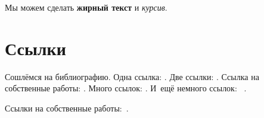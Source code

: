 Мы можем сделать \textbf{жирный текст} и \textit{курсив}.

\section{Ссылки}\label{sec:ch1/sec2}

Сошлёмся на библиографию.
Одна ссылка: \cite[с.~54]{Sokolov}\cite[с.~36]{Gaidaenko}.
Две ссылки: \cite{Sokolov,Gaidaenko}.
Ссылка на собственные работы: \cite{vakbib1, confbib2}.
Много ссылок: %
\cite{Lermontov, Management, Borozda, Marketing, Constitution, FamilyCode,
    Gost.7.0.53, Razumovski, Lagkueva, Pokrovski, Methodology, Berestova,
    Kriger}%
%
.
И~ещё немного ссылок:~\cite{Article,Book,Booklet,Conference,Inbook,Incollection,Manual,Mastersthesis,
    Misc,Phdthesis,Proceedings,Techreport,Unpublished}
\cite{medvedev2006jelektronnye, CEAT:CEAT581, doi:10.1080/01932691.2010.513279,
    Gosele1999161,Li2007StressAnalysis, Shoji199895, test:eisner-sample,
    test:eisner-sample-shorted, AB_patent_Pomerantz_1968, iofis_patent1960}%
%
.

%

Ссылки на собственные работы:~\cite{vakbib1, confbib1}.

